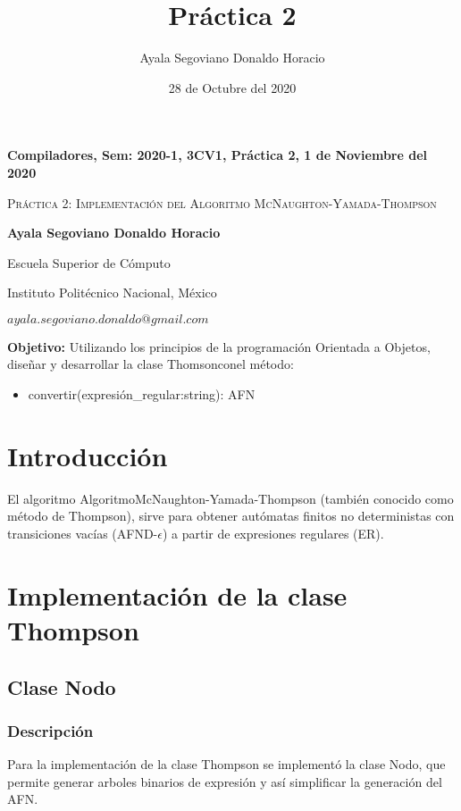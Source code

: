 \documentclass[12pt,letterpaper]{article}
\title{Práctica 2}
\author{Ayala Segoviano Donaldo Horacio}
\date{28 de Octubre del 2020}
\begin{document}
\centerline{\bf Compiladores, Sem: 2020-1, 3CV1, Práctica 2, 1 de Noviembre del 2020}
\centerline{}
\centerline{}
\begin{center}
\Large{\textsc{Práctica 2: Implementación del Algoritmo McNaughton-Yamada-Thompson}}
\end{center}
\centerline{}
\centerline{\bf {Ayala Segoviano Donaldo Horacio}}
\centerline{}
\centerline{Escuela Superior de Cómputo}
\centerline{Instituto Politécnico Nacional, México}
\centerline{$ayala.segoviano.donaldo@gmail.com$}
\newtheorem{Theorem}{\quad Theorem}[section]
\newtheorem{Definition}[Theorem]{\quad Definition}
\newtheorem{Corollary}[Theorem]{\quad Corollary}
\newtheorem{Lemma}[Theorem]{\quad Lemma}
\newtheorem{Example}[Theorem]{\quad Example}

\bigskip
\bigskip


\textbf{Objetivo:} Utilizando los principios de la programación Orientada a Objetos, diseñar y desarrollar la clase Thomsonconel método:\\
\begin{itemize}
    \item convertir(expresión\_regular:string): AFN
\end{itemize}

\bigskip
\bigskip

\setcounter{page}{1}
\thispagestyle{empty}



\section{Introducción}
El algoritmo AlgoritmoMcNaughton-Yamada-Thompson (también conocido como método de Thompson), sirve para obtener autómatas finitos no deterministas con transiciones vacías (AFND-$\epsilon$) a partir de expresiones regulares (ER).\\






\newpage
\section{Implementación de la clase Thompson}
\subsection{Clase Nodo}

\subsubsection{Descripción}
Para la implementación de la clase Thompson se implementó la clase Nodo, que permite generar arboles binarios de expresión y así simplificar la generación del AFN.\\
\end{document}
